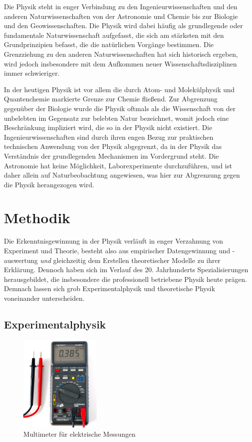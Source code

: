 \documentclass[titlepage, parkskip=full, twocolumn, landscape]{scrartcl}
\begin{document}
Die Physik steht in enger Verbindung zu den Ingenieurwissenschaften und den anderen Naturwissenschaften von der Astronomie und Chemie bis zur Biologie und den Geowissenschaften. Die Physik wird dabei häufig als grundlegende oder fundamentale Naturwissenschaft aufgefasst, die sich am stärksten mit den Grundprinzipien befasst, die die natürlichen Vorgänge bestimmen. Die Grenzziehung zu den anderen Naturwissenschaften hat sich historisch ergeben, wird jedoch insbesondere mit dem Aufkommen neuer Wissenschaftsdisziplinen immer schwieriger.

In der heutigen Physik ist vor allem die durch Atom- und Molekülphysik und Quantenchemie markierte Grenze zur Chemie fließend. Zur Abgrenzung gegenüber der Biologie wurde die Physik oftmals als die Wissenschaft von der unbelebten im Gegensatz zur belebten Natur bezeichnet, womit jedoch eine Beschränkung impliziert wird, die so in der Physik nicht existiert. Die Ingenieurwissenschaften sind durch ihren engen Bezug zur praktischen technischen Anwendung von der Physik abgegrenzt, da in der Physik das Verständnis der grundlegenden Mechanismen im Vordergrund steht. Die Astronomie hat keine Möglichkeit, Laborexperimente durchzuführen, und ist daher allein auf Naturbeobachtung angewiesen, was hier zur Abgrenzung gegen die Physik herangezogen wird.

\section{Methodik}

Die Erkenntnisgewinnung in der Physik verläuft in enger Verzahnung von Experiment und Theorie, besteht also aus empirischer Datengewinnung und -auswertung \emph{und} gleichzeitig dem Erstellen theoretischer Modelle zu ihrer Erklärung. Dennoch haben sich im Verlauf des 20. Jahrhunderts Spezialisierungen herausgebildet, die insbesondere die professionell betriebene Physik heute prägen. Demnach lassen sich grob Experimentalphysik und theoretische Physik voneinander unterscheiden.

\subsection{Experimentalphysik}

\begin{figure}
	\centering
	\includegraphics[width=4cm]{images/2.jpg}
	\caption{Multimeter für elektrische Messungen}
\end{figure}
\end{document}

